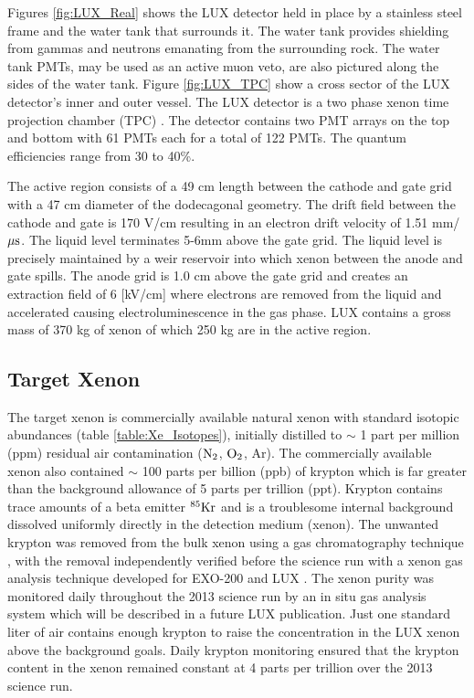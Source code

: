 Figures \ref{fig:LUX_Real} %
shows the LUX detector held in place by a stainless steel frame and the water tank that surrounds it. The water tank provides shielding from gammas and neutrons emanating from the surrounding rock. The water tank PMTs, may be used as an active muon veto, are also pictured along the sides of the water tank. Figure \ref{fig:LUX_TPC} show a cross sector of the LUX detector's inner and outer vessel. The LUX detector is a two phase xenon time projection chamber (TPC)  \cite{LUX_PRL}.  The detector contains two PMT arrays on the top and bottom with 61 PMTs each for a total of 122 PMTs. The quantum efficiencies range from 30 to 40\%. 

The active region consists of a 49 cm length between the cathode and gate grid with a 47 cm diameter of the dodecagonal geometry. The drift field between the cathode and gate is 170 V/cm resulting in an electron drift velocity of 1.51 mm/$\rm \mu s$. The liquid level terminates 5-6mm above the gate grid. The liquid level is precisely maintained by a weir reservoir into which xenon between the anode and gate spills. The anode grid is 1.0 cm above the gate grid and creates an extraction field of 6 [kV/cm] where electrons are removed from the liquid and accelerated causing electroluminescence in the gas phase.  LUX contains a gross mass of 370 kg of xenon of which 250 kg are in the active region.  

\subsection{Target Xenon}
The target xenon is commercially available natural xenon with standard isotopic abundances (table \ref{table:Xe_Isotopes}), initially distilled to $\sim$ 1 part per million (ppm) residual air contamination ($\rm N_2$, $\rm O_2$, Ar). The commercially available xenon also contained $\sim$ 100 parts per billion (ppb) of krypton which is far greater than the background allowance of 5 parts per trillion (ppt). Krypton contains trace amounts of a beta emitter $\rm ^{85}Kr$ and is a troublesome internal background dissolved uniformly directly in the detection medium (xenon). The unwanted krypton was removed from the bulk xenon using a gas chromatography technique \cite{lux_kr_removal}, with the removal independently verified before the science run with a xenon gas analysis technique developed for EXO-200 and LUX \cite{Kr_ppt_Dobi}. The xenon purity was monitored daily throughout the 2013 science run by an in situ gas analysis system which will be described in a future LUX publication. Just one standard liter of air contains enough krypton to raise the concentration in the LUX xenon above the background goals. Daily krypton monitoring ensured that the krypton content in the xenon remained constant at 4 parts per trillion over the 2013 science run\cite{LUX_BG}.



